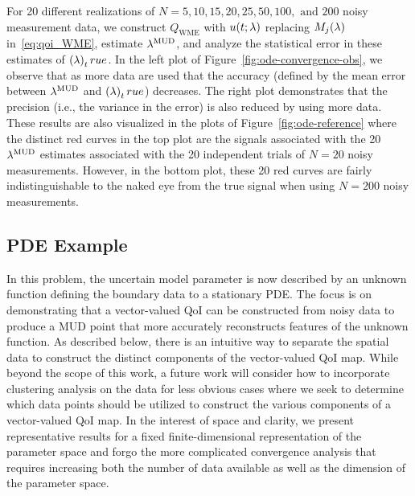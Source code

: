 For 20 different realizations of $N=5, 10, 15, 20, 25, 50, 100, \text{ and } 200$ noisy measurement data, we construct $Q_\text{WME}$ with $u(t;\lambda)$ replacing $M_j(\lambda)$ in~\eqref{eq:qoi_WME}, estimate $\lambda^{\text{MUD}}$, and analyze the statistical error in these estimates of $\left ( \lambda \right )_true$.
In the left plot of Figure~\ref{fig:ode-convergence-obs}, we observe that as more data are used that the accuracy (defined by the mean error between $\lambda^{\text{MUD}}$ and $\left ( \lambda \right )_true$) decreases.
The right plot demonstrates that the precision (i.e., the variance in the error) is also reduced by using more data.
These results are also visualized in the plots of Figure~\ref{fig:ode-reference} where the distinct red curves in the top plot are the signals associated with the 20 $\lambda^{\text{MUD}}$ estimates associated with the 20 independent trials of $N=20$ noisy measurements.
However, in the bottom plot, these 20 red curves are fairly indistinguishable to the naked eye from the true signal when using $N=200$ noisy measurements.

\subsection{PDE Example}\label{subsec:pde-example}

In this problem, the uncertain model parameter is now described by an unknown function defining the boundary data to a stationary PDE.
The focus is on demonstrating that a vector-valued QoI can be constructed from noisy data to produce a MUD point that more accurately reconstructs features of the unknown function.
As described below, there is an intuitive way to separate the spatial data to construct the distinct components of the vector-valued QoI map.
While beyond the scope of this work, a future work will consider how to incorporate clustering analysis on the data for less obvious cases where we seek to determine which data points should be utilized to construct the various components of a vector-valued QoI map.
In the interest of space and clarity, we present representative results for a fixed finite-dimensional representation of the parameter space and forgo the more complicated convergence analysis that requires increasing both the number of data available as well as the dimension of the parameter space.

